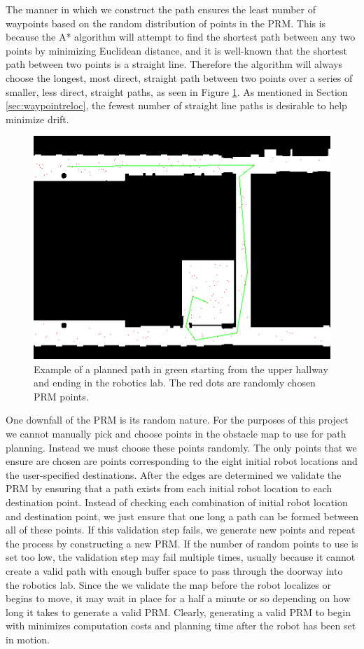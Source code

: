 \documentclass[12pt]{article}
\begin{document}
The manner in which we construct the path ensures the least number of waypoints based on the random distribution of points in the PRM. This is because the A* algorithm will attempt to find the shortest path between any two points by minimizing Euclidean distance, and it is well-known that the shortest path between two points is a straight line. Therefore the algorithm will always choose the longest, most direct, straight path between two points over a series of smaller, less direct, straight paths, as seen in Figure \ref{fig:expath}. As mentioned in Section \ref{sec:waypointreloc}, the fewest number of straight line paths is desirable to help minimize drift.

\begin{figure}[H]
\centering
\includegraphics[scale=.4]{img/expath.jpg}
\caption{Example of a planned path in green starting from the upper hallway and ending in the robotics lab. The red dots are randomly chosen PRM points.}
\label{fig:expath}
\end{figure}


One downfall of the PRM is its random nature. For the purposes of this project we cannot manually pick and choose points in the obstacle map to use for path planning. Instead we must choose these points randomly. The only points that we ensure are chosen are points corresponding to the eight initial robot locations and the user-specified destinations. After the edges are determined we validate the PRM by ensuring that a path exists from each initial robot location to each destination point. Instead of checking each combination of initial robot location and destination point, we just ensure that one long a path can be formed between all of these points. If this validation step fails, we generate new points and repeat the process by constructing a new PRM. If the number of random points to use is set too low, the validation step may fail multiple times, usually because it cannot create a valid path with enough buffer space to pass through the doorway into the robotics lab. Since the we validate the map before the robot localizes or begins to move, it may wait in place for a half a minute or so depending on how long it takes to generate a valid PRM. Clearly, generating a valid PRM to begin with minimizes computation costs and planning time after the robot has been set in motion.
\end{document}
